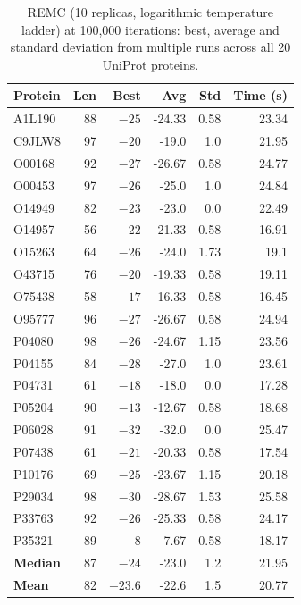 \begin{table}[!htbp]
\centering
\caption[REMC benchmark at 100k iterations]{REMC (10 replicas, logarithmic temperature ladder) at 100,000 iterations: best, average and standard deviation from multiple runs across all 20 UniProt proteins.}
\label{tab:remc_benchmark}
\small
\begin{tabular}{lrrrrr}
\hline
\textbf{Protein} & \textbf{Len} & \textbf{Best} & \textbf{Avg} & \textbf{Std} & \textbf{Time (s)} \\
\hline
A1L190 & 88 & $-25$ & -24.33 & 0.58 & 23.34 \\
C9JLW8 & 97 & $-20$ & -19.0 & 1.0 & 21.95 \\
O00168 & 92 & $-27$ & -26.67 & 0.58 & 24.77 \\
O00453 & 97 & $-26$ & -25.0 & 1.0 & 24.84 \\
O14949 & 82 & $-23$ & -23.0 & 0.0 & 22.49 \\
O14957 & 56 & $-22$ & -21.33 & 0.58 & 16.91 \\
O15263 & 64 & $-26$ & -24.0 & 1.73 & 19.1 \\
O43715 & 76 & $-20$ & -19.33 & 0.58 & 19.11 \\
O75438 & 58 & $-17$ & -16.33 & 0.58 & 16.45 \\
O95777 & 96 & $-27$ & -26.67 & 0.58 & 24.94 \\
P04080 & 98 & $-26$ & -24.67 & 1.15 & 23.56 \\
P04155 & 84 & $-28$ & -27.0 & 1.0 & 23.61 \\
P04731 & 61 & $-18$ & -18.0 & 0.0 & 17.28 \\
P05204 & 90 & $-13$ & -12.67 & 0.58 & 18.68 \\
P06028 & 91 & $-32$ & -32.0 & 0.0 & 25.47 \\
P07438 & 61 & $-21$ & -20.33 & 0.58 & 17.54 \\
P10176 & 69 & $-25$ & -23.67 & 1.15 & 20.18 \\
P29034 & 98 & $-30$ & -28.67 & 1.53 & 25.58 \\
P33763 & 92 & $-26$ & -25.33 & 0.58 & 24.17 \\
P35321 & 89 & $-8$ & -7.67 & 0.58 & 18.17 \\
\hline
\textbf{Median} & 87 & $-24$ & -23.0 & 1.2 & 21.95 \\
\textbf{Mean} & 82 & $-23.6$ & -22.6 & 1.5 & 20.77 \\
\hline
\end{tabular}
\end{table}
\FloatBarrier

